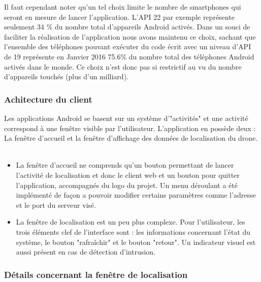 	Il faut cependant noter qu'un tel choix limite le nombre de smartphones qui seront en mesure de lancer l'application. L'API 22 par exemple représente seulement 34 \% du nombre total d'appareils Android activés. Dans un souci de faciliter la réalisation de l'application nous avons maintenu ce choix, sachant que l'ensemble des téléphones pouvant exécuter du code écrit avec un niveau d'API de 19 représente en Janvier 2016 75.6\% du nombre total des téléphones Android activés dans le monde. Ce choix n'est donc pas si restrictif au vu du nombre d'appareils touchés (plus d'un milliard).

\subsubsection{Achitecture du client}

	Les applications Android se basent sur un système d'"activités" et une activité correspond à une fenêtre visible par l'utilisateur. L'application en possède deux : La fenêtre d'accueil et la fenêtre d'affichage des données de localisation du drone. 
	~\\
	\begin{itemize}
	
	\item La fenêtre d'accueil ne comprends qu'un bouton permettant de lancer l'activité de localisation et donc le client web et un bouton pour quitter l'application, accompagnés du logo du projet. Un menu déroulant a été implémenté de façon a pouvoir modifier certains paramètres comme l'adresse et le port du serveur visé.
	~\\
	\item La fenêtre de localisation est un peu plus complexe. Pour l'utilisateur, les trois éléments clef de l'interface sont : les informations concernant l'état du système, le bouton "rafraîchir" et le bouton "retour". Un indicateur visuel est aussi présent en cas de détection d'intrusion.
	
	\end{itemize}		
	
\subsubsection{Détails concernant la fenêtre de localisation}

	
	 

	

